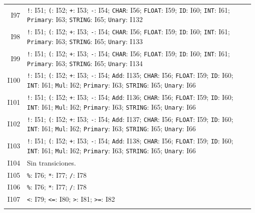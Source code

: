 {\begin{longtable}{@{}r p{14.7cm}@{}}
I97 & \texttt{!}: I51; \texttt{(}: I52; \texttt{+}: I53; \texttt{-}: I54; \texttt{CHAR}: I56; \texttt{FLOAT}: I59; \texttt{ID}: I60; \texttt{INT}: I61; \texttt{Primary}: I63; \texttt{STRING}: I65; \texttt{Unary}: I132\\\addlinespace[3pt]
I98 & \texttt{!}: I51; \texttt{(}: I52; \texttt{+}: I53; \texttt{-}: I54; \texttt{CHAR}: I56; \texttt{FLOAT}: I59; \texttt{ID}: I60; \texttt{INT}: I61; \texttt{Primary}: I63; \texttt{STRING}: I65; \texttt{Unary}: I133\\\addlinespace[3pt]
I99 & \texttt{!}: I51; \texttt{(}: I52; \texttt{+}: I53; \texttt{-}: I54; \texttt{CHAR}: I56; \texttt{FLOAT}: I59; \texttt{ID}: I60; \texttt{INT}: I61; \texttt{Primary}: I63; \texttt{STRING}: I65; \texttt{Unary}: I134\\\addlinespace[3pt]
I100 & \texttt{!}: I51; \texttt{(}: I52; \texttt{+}: I53; \texttt{-}: I54; \texttt{Add}: I135; \texttt{CHAR}: I56; \texttt{FLOAT}: I59; \texttt{ID}: I60; \texttt{INT}: I61; \texttt{Mul}: I62; \texttt{Primary}: I63; \texttt{STRING}: I65; \texttt{Unary}: I66\\\addlinespace[3pt]
I101 & \texttt{!}: I51; \texttt{(}: I52; \texttt{+}: I53; \texttt{-}: I54; \texttt{Add}: I136; \texttt{CHAR}: I56; \texttt{FLOAT}: I59; \texttt{ID}: I60; \texttt{INT}: I61; \texttt{Mul}: I62; \texttt{Primary}: I63; \texttt{STRING}: I65; \texttt{Unary}: I66\\\addlinespace[3pt]
I102 & \texttt{!}: I51; \texttt{(}: I52; \texttt{+}: I53; \texttt{-}: I54; \texttt{Add}: I137; \texttt{CHAR}: I56; \texttt{FLOAT}: I59; \texttt{ID}: I60; \texttt{INT}: I61; \texttt{Mul}: I62; \texttt{Primary}: I63; \texttt{STRING}: I65; \texttt{Unary}: I66\\\addlinespace[3pt]
I103 & \texttt{!}: I51; \texttt{(}: I52; \texttt{+}: I53; \texttt{-}: I54; \texttt{Add}: I138; \texttt{CHAR}: I56; \texttt{FLOAT}: I59; \texttt{ID}: I60; \texttt{INT}: I61; \texttt{Mul}: I62; \texttt{Primary}: I63; \texttt{STRING}: I65; \texttt{Unary}: I66\\\addlinespace[3pt]
I104 & Sin transiciones.\\\addlinespace[3pt]
I105 & \texttt{\%}: I76; \texttt{*}: I77; \texttt{/}: I78\\\addlinespace[3pt]
I106 & \texttt{\%}: I76; \texttt{*}: I77; \texttt{/}: I78\\\addlinespace[3pt]
I107 & \texttt{\textless{}}: I79; \texttt{\textless{}=}: I80; \texttt{\textgreater{}}: I81; \texttt{\textgreater{}=}: I82\\\addlinespace[3pt]

\end{longtable}}
